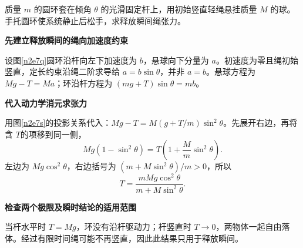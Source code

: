 \begin{question}\begin{example}[斜杆圆环与竖直悬球]\label{n2e7}
质量 $m$ 的圆环套在倾角 $\theta$ 的光滑固定杆上，用初始竖直轻绳悬挂质量 $M$ 的球。手托圆环使系统静止后松手，求释放瞬间绳张力。
\end{example}\end{question}
\begin{solution}\textbf{先建立释放瞬间的绳向加速度约束}\par\nobreak
设图\ref{n2e7q}圆环沿杆向左下加速度为 $b$，悬球向下分量为 $a$。初速度为零且绳初始竖直，定长约束沿绳二阶求导给 $a=b\sin\theta$，并非 $a=b$。悬球方程为 $Mg-T=Ma$；环沿杆方程为 $(mg+T)\sin\theta=mb$。


\par\medskip{}\noindent\textbf{代入动力学消元求张力}\par\nobreak
用图\ref{n2e7s}的投影关系代入：$Mg-T=M(g+T/m)\sin^2\theta$。先展开右边，再将含 $T$的项移到同一侧，
\[
 Mg(1-\sin^2\theta)=T\left(1+\frac Mm\sin^2\theta\right).
\]
左边为 $Mg\cos^2\theta$，右边括号为 $(m+M\sin^2\theta)/m>0$，所以
\[T=\frac{mMg\cos^2\theta}{m+M\sin^2\theta}.\]


\par\medskip{}\noindent\textbf{检查两个极限及瞬时结论的适用范围}\par\nobreak
当杆水平时 $T=Mg$，环没有沿杆驱动力；杆竖直时 $T\to0$，两物体一起自由落体。经过有限时间绳可能不再竖直，因此此结果只用于释放瞬间。
\end{solution}

